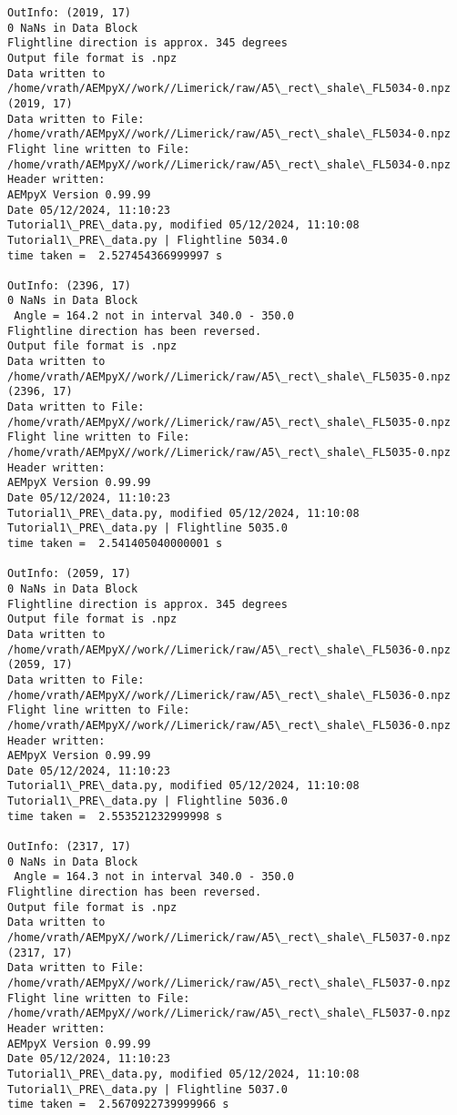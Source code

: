 \documentclass[11pt]{article}
\begin{document}
\begin{Verbatim}[commandchars=\\\{\}]
OutInfo: (2019, 17)
0 NaNs in Data Block
Flightline direction is approx. 345 degrees
Output file format is .npz
Data written to
/home/vrath/AEMpyX//work//Limerick/raw/A5\_rect\_shale\_FL5034-0.npz
(2019, 17)
Data written to File:
/home/vrath/AEMpyX//work//Limerick/raw/A5\_rect\_shale\_FL5034-0.npz
Flight line written to File:
/home/vrath/AEMpyX//work//Limerick/raw/A5\_rect\_shale\_FL5034-0.npz
Header written:
AEMpyX Version 0.99.99
Date 05/12/2024, 11:10:23
Tutorial1\_PRE\_data.py, modified 05/12/2024, 11:10:08
Tutorial1\_PRE\_data.py | Flightline 5034.0
time taken =  2.527454366999997 s

OutInfo: (2396, 17)
0 NaNs in Data Block
 Angle = 164.2 not in interval 340.0 - 350.0
Flightline direction has been reversed.
Output file format is .npz
Data written to
/home/vrath/AEMpyX//work//Limerick/raw/A5\_rect\_shale\_FL5035-0.npz
(2396, 17)
Data written to File:
/home/vrath/AEMpyX//work//Limerick/raw/A5\_rect\_shale\_FL5035-0.npz
Flight line written to File:
/home/vrath/AEMpyX//work//Limerick/raw/A5\_rect\_shale\_FL5035-0.npz
Header written:
AEMpyX Version 0.99.99
Date 05/12/2024, 11:10:23
Tutorial1\_PRE\_data.py, modified 05/12/2024, 11:10:08
Tutorial1\_PRE\_data.py | Flightline 5035.0
time taken =  2.541405040000001 s

OutInfo: (2059, 17)
0 NaNs in Data Block
Flightline direction is approx. 345 degrees
Output file format is .npz
Data written to
/home/vrath/AEMpyX//work//Limerick/raw/A5\_rect\_shale\_FL5036-0.npz
(2059, 17)
Data written to File:
/home/vrath/AEMpyX//work//Limerick/raw/A5\_rect\_shale\_FL5036-0.npz
Flight line written to File:
/home/vrath/AEMpyX//work//Limerick/raw/A5\_rect\_shale\_FL5036-0.npz
Header written:
AEMpyX Version 0.99.99
Date 05/12/2024, 11:10:23
Tutorial1\_PRE\_data.py, modified 05/12/2024, 11:10:08
Tutorial1\_PRE\_data.py | Flightline 5036.0
time taken =  2.553521232999998 s

OutInfo: (2317, 17)
0 NaNs in Data Block
 Angle = 164.3 not in interval 340.0 - 350.0
Flightline direction has been reversed.
Output file format is .npz
Data written to
/home/vrath/AEMpyX//work//Limerick/raw/A5\_rect\_shale\_FL5037-0.npz
(2317, 17)
Data written to File:
/home/vrath/AEMpyX//work//Limerick/raw/A5\_rect\_shale\_FL5037-0.npz
Flight line written to File:
/home/vrath/AEMpyX//work//Limerick/raw/A5\_rect\_shale\_FL5037-0.npz
Header written:
AEMpyX Version 0.99.99
Date 05/12/2024, 11:10:23
Tutorial1\_PRE\_data.py, modified 05/12/2024, 11:10:08
Tutorial1\_PRE\_data.py | Flightline 5037.0
time taken =  2.5670922739999966 s


\end{Verbatim}
\end{document}
